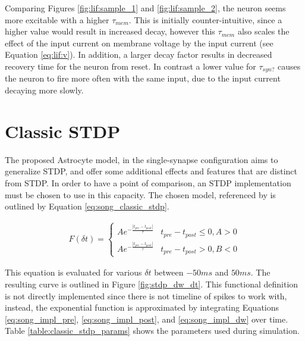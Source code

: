 

Comparing Figures \ref{fig:lif:sample_1} and \ref{fig:lif:sample_2}, the
neuron seems more excitable with a higher $\tau_{mem}$. This is initially
counter-intuitive, since a higher value would result in increased decay,
however this $\tau_{mem}$ also scales the effect of the input current on
membrane voltage by the input current (see Equation \ref{eq:lif:v}). In
addition, a larger decay factor results in decreased recovery time for the
neuron from reset. In contrast a lower value for $\tau_{syn?}$ causes the
neuron to fire more often with the same input, due to the input current
decaying more slowly.

\section{Classic STDP} \label{obj1:sec:classic_stdp}
    
The proposed Astrocyte model, in the single-synapse configuration aims to
generalize STDP, and offer some additional effects and features that are
distinct from STDP. In order to have a point of comparison, an STDP
implementation must be chosen to use in this capacity. The chosen model,
referenced by \parencite{song_2000} is outlined by Equation
\ref{eq:song_classic_stdp}.

\begin{align}
  F(\delta t) =
  \begin{cases} 
    Ae^{- \frac{|t_{pre}-t_{post}|}{\tau}} & t_{pre} - t_{post} \leq 0, A > 0
    \\ Ae^{- \frac{|t_{pre}-t_{post}|}{\tau}} & t_{pre} - t_{post} > 0, B < 0
  \end{cases} \label{eq:song_classic_stdp}
\end{align}

This equation is evaluated for various $\delta t$ between $-50ms$ and
$50ms$. The resulting curve is outlined in Figure \ref{fig:stdp_dw_dt}. This
functional definition is not directly implemented since there is not timeline of
spikes to work with, instead, the exponential function is approximated by
integrating Equations \ref{eq:song_impl_pre}, \ref{eq:song_impl_post}, and
\ref{eq:song_impl_dw} over time. Table \ref{table:classic_stdp_params} shows the
parameters used during simulation.

